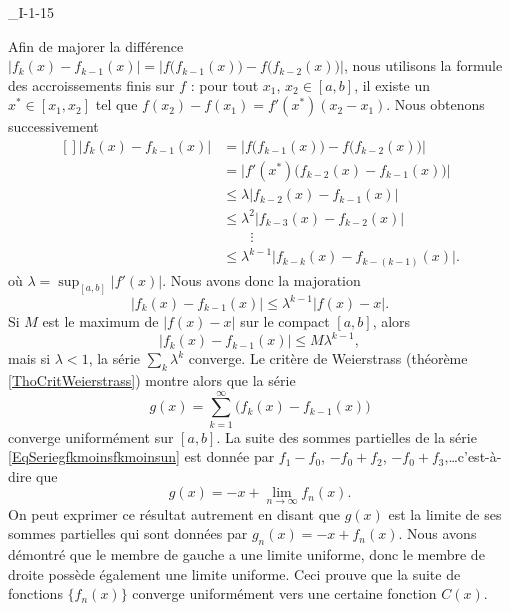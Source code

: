 

\begin{corrige}{_I-1-15}

Afin de majorer la différence $| f_k(x)-f_{k-1}(x) |=| f\big( f_{k-1}(x) \big)-f\big( f_{k-2}(x) \big) |$, nous utilisons la formule des accroissements finis sur $f$ : pour tout $x_1$, $x_2\in[a,b]$, il existe un $x^*\in[x_1,x_2]$ tel que $f(x_2)-f(x_1)=f'(x^*)(x_2-x_1)$. Nous obtenons successivement 
\begin{equation}
	\begin{aligned}[]
		| f_k(x)-f_{k-1}(x) |	&=	\Big| f\big( f_{k-1}(x) \big)-f\big( f_{k-2}(x) \big) \Big|\\
					&=	\Big| f'(x^*)\big( f_{k-2}(x)-f_{k-1}(x) \big)  \Big|\\
					&\leq	\lambda\big| f_{k-2}(x)-f_{k-1}(x) \big|\\
					&\leq	\lambda^2\big| f_{k-3}(x)-f_{k-2}(x) \big|\\
					&\qquad\vdots	\\
					&\leq	\lambda^{k-1}\big| f_{k-k}(x)-f_{k-(k-1)}(x) \big|.
	\end{aligned}
\end{equation}
où $\lambda=\sup_{[a,b]}| f'(x) |$. Nous avons donc la majoration
\begin{equation}
	| f_k(x)-f_{k-1}(x)|\leq \lambda^{k-1}| f(x)-x |.
\end{equation}
Si $M$ est le maximum de $| f(x)-x |$ sur le compact $[a,b]$, alors
\begin{equation}
	| f_k(x)-f_{k-1}(x)|\leq M\lambda^{k-1},
\end{equation}
mais si $\lambda<1$, la série $\sum_k\lambda^k$ converge. Le critère de Weierstrass (théorème \ref{ThoCritWeierstrass}) montre alors que la série
\begin{equation}		\label{EqSeriegfkmoinsfkmoinsun}
	g(x)=\sum_{k=1}^{\infty}\big( f_k(x)-f_{k-1}(x) \big)
\end{equation}
converge uniformément sur $[a,b]$. La suite des sommes partielles de la série \eqref{EqSeriegfkmoinsfkmoinsun} est donnée par $f_1-f_0$, $-f_0+f_2$, $-f_0+f_3$,\ldots c'est-à-dire que
\begin{equation}
	g(x)=-x+\lim_{n\to\infty}f_n(x).
\end{equation}
On peut exprimer ce résultat autrement en disant que $g(x)$ est la limite de ses sommes partielles qui sont données par $g_n(x)=-x+f_n(x)$. Nous avons démontré que le membre de gauche a une limite uniforme, donc le membre de droite possède également une limite uniforme. Ceci prouve que la suite de fonctions $\{ f_n(x) \}$ converge uniformément vers une certaine fonction $C(x)$.


\end{corrige}
